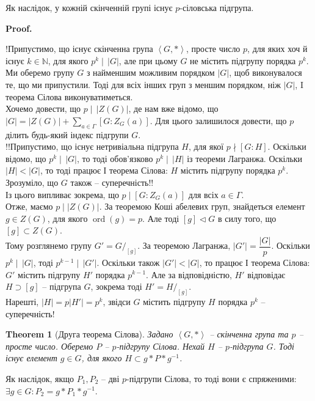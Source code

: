 \documentclass[a4paper, 10pt]{article}
\makeatletter
\theoremstyle{theoremdd}
\newtheorem{theorem}{Theorem}[subsection]
\theoremstyle{theoremdd}
\theoremstyle{theoremdd}
\theoremstyle{theoremdd}
\theoremstyle{theoremdd}
\theoremstyle{theoremdd}
\theoremstyle{theoremdd}
\theoremstyle{theoremdd}
\theoremstyle{theoremdd}
\theoremstyle{theoremdd}
\theoremstyle{theoremdd}
\theoremstyle{theoremdd}
\theoremstyle{theoremdd}
\theoremstyle{theoremdd}
\theoremstyle{theoremdd}
\renewenvironment{proof}[1][Proof.\\]{\par
\pushQED{\hfill \qed}%
\normalfont \topsep6\p@\@plus6\p@\relax
\trivlist
\item\relax
{\bfseries
#1\@addpunct{.}}\hspace\labelsep\ignorespaces
}{%
\popQED\endtrivlist\@endpefalse
}
\DeclareMathOperator{\ord}{ord}
\makeatother
\begin{document}
Як наслідок, у кожній скінченній групі існує $p$-сіловська підгрупа.

\begin{proof}
!Припустимо, що існує скінченна група $\left< G, *\right>$, просте число $p$, для яких хоч й існує $k \in \mathbb{N}$, для якого $p^k \mid \, |G|$, але при цьому $G$ не містить підгрупу порядка $p^k$.\\
Ми оберемо групу $G$ з найменшим можливим порядком $|G|$, щоб виконувалося те, що ми припустили. Тоді для всіх інших груп з меншим порядком, ніж $|G|$, I теорема Сілова виконуватиметься.\\
Хочемо довести, що $p \mid \, |Z(G)|$, де нам вже відомо, що $|G| = |Z(G)| + \displaystyle\sum_{a \in \Gamma} [G:Z_G(a)]$. Для цього залишилося довести, що $p$ ділить будь-який індекс підгрупи $G$.\\
!!Припустимо, що існує нетривіальна підгрупа $H$, для якої $p \nmid [G:H]$. Оскільки відомо, що $p^k \mid \, |G|$, то тоді обов'язково $p^k \mid \, |H|$ із теореми Лагранжа. Оскільки $|H| < |G|$, то тоді працює І теорема Сілова: $H$ містить підгрупу порядка $p^k$. Зрозуміло, що $G$ також -- суперечність!!\\
Із цього випливає зокрема, що $p \mid [G:Z_G(a)]$ для всіх $a \in \Gamma$.\\
Отже, маємо $p \mid |Z(G)|$. За теоремою Коші абелевих груп, знайдеться елемент $g \in Z(G)$, для якого $\ord(g) = p$. Але тоді $[g] \triangleleft G$ в силу того, що $[g] \subset Z(G)$.\\
Тому розглянемо групу $G' = G/_{[g]}$. За теоремою Лагранжа, $|G'| = \dfrac{|G|}{p}$. Оскільки $p^k \mid \, |G|$, тоді $p^{k-1} \mid \, |G'|$. Оскільки також $|G'| < |G|$, то працює І теорема Сілова: $G'$ містить підгрупу $H'$ порядка $p^{k-1}$. Але за відповідністю, $H'$ відповідає $H \supset [g]$ -- підгрупа $G$, зокрема тоді $H' = H/_{[g]}$.\\
Нарешті, $|H| = p |H'| = p^k$, звідси $G$ містить підгрупу $H$ порядка $p^k$ -- суперечність!
\end{proof}

\begin{theorem}[Друга теорема Сілова]
Задано $\left< G, * \right>$ -- скінченна група та $p$ -- просте число. Оберемо $P$ -- $p$-підгрупу Сілова. Нехай $H$ -- $p$-підгрупа $G$. Тоді існує елемент $g \in G$, для якого $H \subset g*P*g^{-1}$.
\end{theorem}

Як наслідок, якщо $P_1,P_2$ -- дві $p$-підгрупи Сілова, то тоді вони є спряженими: $\exists g \in G: P_2 = g*P_1*g^{-1}$.
\end{document}
